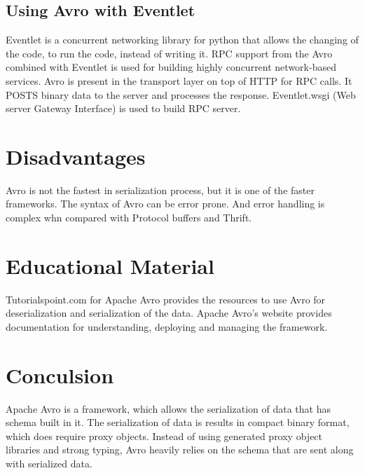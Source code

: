 \documentclass[9pt,twocolumn,twoside]{../../styles/osajnl}
\begin{document}
\subsection{Using Avro with Eventlet}

Eventlet is a concurrent networking library for python that allows the
changing of the code, to run the code, instead of writing it.  RPC
support from the Avro combined with Eventlet is used for building
highly concurrent network-based services. Avro is present in the
transport layer on top of HTTP for RPC calls. It POSTS binary data to
the server and processes the response. Eventlet.wsgi (Web server
Gateway Interface) is used to build RPC server.

\section{Disadvantages}

Avro is not the fastest in serialization process, but it is one of the
faster frameworks.  The syntax of Avro can be error prone. And error
handling is complex whn compared with Protocol buffers and Thrift.

\section{Educational Material}

Tutorialspoint.com for Apache Avro provides the resources to use Avro
for deserialization and serialization of the data.  Apache Avro’s
website provides documentation for understanding, deploying and
managing the framework.

\section{Conculsion}

Apache Avro is a framework, which allows the serialization of data
that has schema built in it. The serialization of data is results in
compact binary format, which does require proxy objects. Instead of
using generated proxy object libraries and strong typing, Avro heavily
relies on the schema that are sent along with serialized data.


\end{document}
